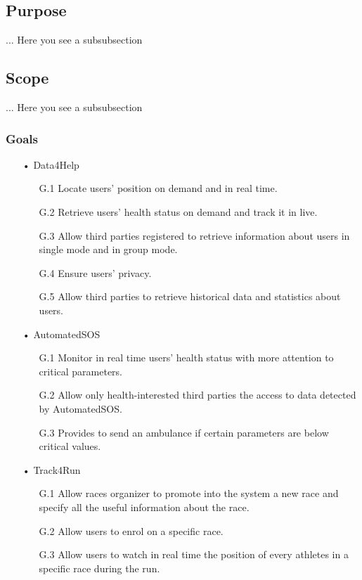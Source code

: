 \subsection{Purpose}
... Here you see a subsubsection
\subsection{Scope}
... Here you see a subsubsection
\subsubsection{Goals}

\begin{enumerate}
\item[•] {\Large Data4Help}
	\begin{enumerate}
		\item [G.1] Locate users' position on demand and in real time.
		\item [G.2] Retrieve users’ health status on demand and track it in live.
		\item [G.3] Allow third parties registered to retrieve information about users in 					single mode and in group mode.
		\item [G.4] Ensure users' privacy.
		\item [G.5] Allow third parties to retrieve historical data and statistics about 					users.
	\end{enumerate}
	
\item[•] {\Large AutomatedSOS}
	\begin{enumerate}
		\item [G.1] Monitor in real time users’ health status with more attention to 						critical parameters.
		\item [G.2] Allow only health-interested third parties the access to data detected 					by AutomatedSOS.
		\item [G.3] Provides to send an ambulance if certain parameters are below critical 					values.
	\end{enumerate}
	
\item[•] {\Large Track4Run}	
	\begin{enumerate}
		\item [G.1] Allow races organizer to promote into the system a new race and specify 			all the useful information about the race.
		\item [G.2] Allow users to enrol on a specific race.
		\item [G.3] Allow users to watch in real time the position of every athletes in a 				specific race during the run.
	\end{enumerate}
\end{enumerate}


